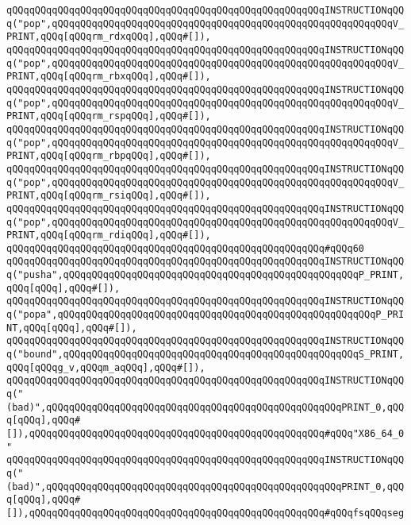 \verb|qQQqqQQqqQQqqQQqqQQqqQQqqQQqqQQqqQQqqQQqqQQqqQQqqQQqqQQqINSTRUCTIONqQQq("pop",qQQqqQQqqQQqqQQqqQQqqQQqqQQqqQQqqQQqqQQqqQQqqQQqqQQqqQQqqQQqV_PRINT,qQQq[qQQqrm_rdxqQQq],qQQq#[]),|\newline
\verb|qQQqqQQqqQQqqQQqqQQqqQQqqQQqqQQqqQQqqQQqqQQqqQQqqQQqqQQqINSTRUCTIONqQQq("pop",qQQqqQQqqQQqqQQqqQQqqQQqqQQqqQQqqQQqqQQqqQQqqQQqqQQqqQQqqQQqV_PRINT,qQQq[qQQqrm_rbxqQQq],qQQq#[]),|\newline
\verb|qQQqqQQqqQQqqQQqqQQqqQQqqQQqqQQqqQQqqQQqqQQqqQQqqQQqqQQqINSTRUCTIONqQQq("pop",qQQqqQQqqQQqqQQqqQQqqQQqqQQqqQQqqQQqqQQqqQQqqQQqqQQqqQQqqQQqV_PRINT,qQQq[qQQqrm_rspqQQq],qQQq#[]),|\newline
\verb|qQQqqQQqqQQqqQQqqQQqqQQqqQQqqQQqqQQqqQQqqQQqqQQqqQQqqQQqINSTRUCTIONqQQq("pop",qQQqqQQqqQQqqQQqqQQqqQQqqQQqqQQqqQQqqQQqqQQqqQQqqQQqqQQqqQQqV_PRINT,qQQq[qQQqrm_rbpqQQq],qQQq#[]),|\newline
\verb|qQQqqQQqqQQqqQQqqQQqqQQqqQQqqQQqqQQqqQQqqQQqqQQqqQQqqQQqINSTRUCTIONqQQq("pop",qQQqqQQqqQQqqQQqqQQqqQQqqQQqqQQqqQQqqQQqqQQqqQQqqQQqqQQqqQQqV_PRINT,qQQq[qQQqrm_rsiqQQq],qQQq#[]),|\newline
\verb|qQQqqQQqqQQqqQQqqQQqqQQqqQQqqQQqqQQqqQQqqQQqqQQqqQQqqQQqINSTRUCTIONqQQq("pop",qQQqqQQqqQQqqQQqqQQqqQQqqQQqqQQqqQQqqQQqqQQqqQQqqQQqqQQqqQQqV_PRINT,qQQq[qQQqrm_rdiqQQq],qQQq#[]),|\newline
\verb|qQQqqQQqqQQqqQQqqQQqqQQqqQQqqQQqqQQqqQQqqQQqqQQqqQQqqQQq#qQQq60|\newline
\verb|qQQqqQQqqQQqqQQqqQQqqQQqqQQqqQQqqQQqqQQqqQQqqQQqqQQqqQQqINSTRUCTIONqQQq("pusha",qQQqqQQqqQQqqQQqqQQqqQQqqQQqqQQqqQQqqQQqqQQqqQQqqQQqP_PRINT,qQQq[qQQq],qQQq#[]),|\newline
\verb|qQQqqQQqqQQqqQQqqQQqqQQqqQQqqQQqqQQqqQQqqQQqqQQqqQQqqQQqINSTRUCTIONqQQq("popa",qQQqqQQqqQQqqQQqqQQqqQQqqQQqqQQqqQQqqQQqqQQqqQQqqQQqqQQqP_PRINT,qQQq[qQQq],qQQq#[]),|\newline
\verb|qQQqqQQqqQQqqQQqqQQqqQQqqQQqqQQqqQQqqQQqqQQqqQQqqQQqqQQqINSTRUCTIONqQQq("bound",qQQqqQQqqQQqqQQqqQQqqQQqqQQqqQQqqQQqqQQqqQQqqQQqqQQqS_PRINT,qQQq[qQQqg_v,qQQqm_aqQQq],qQQq#[]),|\newline
\verb|qQQqqQQqqQQqqQQqqQQqqQQqqQQqqQQqqQQqqQQqqQQqqQQqqQQqqQQqINSTRUCTIONqQQq("(bad)",qQQqqQQqqQQqqQQqqQQqqQQqqQQqqQQqqQQqqQQqqQQqqQQqqQQqPRINT_0,qQQq[qQQq],qQQq#[]),qQQqqQQqqQQqqQQqqQQqqQQqqQQqqQQqqQQqqQQqqQQqqQQqqQQq#qQQq"X86_64_0"|\newline
\verb|qQQqqQQqqQQqqQQqqQQqqQQqqQQqqQQqqQQqqQQqqQQqqQQqqQQqqQQqINSTRUCTIONqQQq("(bad)",qQQqqQQqqQQqqQQqqQQqqQQqqQQqqQQqqQQqqQQqqQQqqQQqqQQqPRINT_0,qQQq[qQQq],qQQq#[]),qQQqqQQqqQQqqQQqqQQqqQQqqQQqqQQqqQQqqQQqqQQqqQQqqQQq#qQQqfsqQQqseg|\newline
